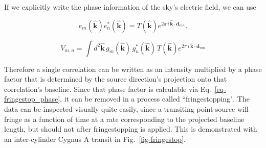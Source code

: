 \noindent If we explicitly write the phase information of the sky's 
electric field, we can use 

\begin{equation}
\label{eqn-tsky}
e_m(\mathbf{\hat{k}}) e_n^*(\mathbf{\hat{k}}) = T(\mathbf{\hat{k}}) 
e^{2\pi \,i \,\mathbf{\hat{k}} \cdot \mathbf{d}_{mn}}.
\end{equation}

\begin{equation}
\label{eqn-visibility-temp}
     V_{m,n} = \int d^2\mathbf{\hat{k}} \,
     g_m(\mathbf{\hat{k}}) \, g^*_n(\mathbf{\hat{k}})\, T(\mathbf{\hat{k}}) 
e^{2\pi \,i \,\mathbf{\hat{k}} \cdot \mathbf{d}_{mn}}
\end{equation}


Therefore a single correlation can be written as an intensity multiplied 
by a phase factor that is determined by the source direction's
projection onto that correlation's baseline. Since that phase 
factor is calculable via Eq.~\ref{eq-fringestop_phase}, it 
can be removed in a process called ``fringestopping". The 
data can be inspected visually quite easily, since 
a transiting point-source will fringe as a function of 
time at a rate corresponding 
to the projected baseline length, but should not after fringestopping 
is applied. This is demonstrated with an inter-cylinder Cygnus A transit in 
Fig.~\ref{fig-fringestop}. 


